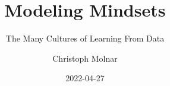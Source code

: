\documentclass[
  10pt,
]{scrbook}
\title{Modeling Mindsets}
\subtitle{The Many Cultures of Learning From Data}
\author{Christoph Molnar}
\date{2022-04-27}
\begin{document}
\maketitle

\thispagestyle{empty}

\end{document}
